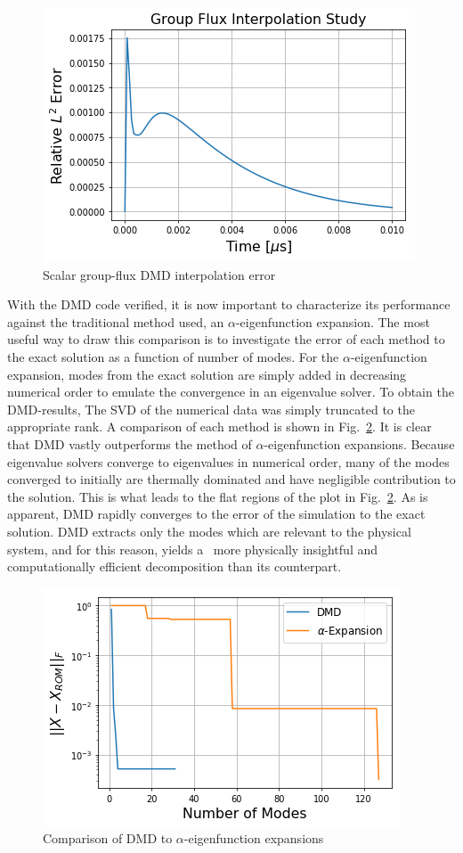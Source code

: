 \documentclass[12pt]{article}
\newcommand{\LFI}[1]{\label{fi:#1}}
\newcommand{\FI}[1]{Fig.~\ref{fi:#1}}
\newcommand{\bfg}{\begin{figure}}
\newcommand{\efg}{\end{figure}}
\begin{document}
%
\bfg[!htb] \centering
	\includegraphics[scale=0.5]{flux_interp_error.png}
	\caption{Scalar group-flux DMD interpolation error}
	\LFI{interp-flux}
\efg

With the DMD code verified, it is now important to characterize its performance against the traditional 
	method used, an $\alpha$-eigenfunction expansion.
The most useful way to draw this comparison is to investigate the error of each method to the exact 
	solution as a function of number of modes.
For the $\alpha$-eigenfunction expansion, modes from the exact solution are simply added in 	
	decreasing numerical order to emulate the convergence in an eigenvalue solver.
To obtain the DMD-results, The SVD of the numerical data was simply truncated to the appropriate rank.
A comparison of each method is shown in \FI{comp}. It is clear that DMD vastly outperforms the 
	method of $\alpha$-eigenfunction expansions.
Because eigenvalue solvers converge to eigenvalues in numerical order, many of the modes converged 
	to initially are thermally dominated and have negligible 
 contribution to the solution. 
This is what leads to the flat regions of the plot in \FI{comp}. 
As is apparent, DMD rapidly converges to the error of the simulation to the exact solution.
DMD extracts only the modes which are relevant to the physical system, and for this reason, yields a \	
	more physically insightful and computationally efficient decomposition than its counterpart.

\bfg[!htb] \centering
	\includegraphics[scale=0.5]{method_comparison.png}
	\caption{Comparison of DMD to $\alpha$-eigenfunction expansions}
	\LFI{comp}
\efg
\end{document}
